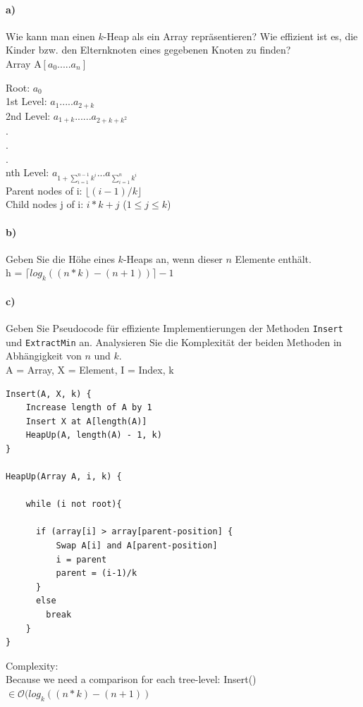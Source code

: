 \documentclass[paper=a4, fontsize=11pt]{scrartcl}
\numberwithin{equation}{section}
\numberwithin{figure}{section}
\numberwithin{table}{section}
\begin{document}
\paragraph{a)}
Wie kann man einen $k$-Heap als ein Array repräsentieren? Wie effizient ist es, die Kinder bzw. den Elternknoten eines gegebenen Knoten zu finden? \\

Array A$[a_0 ..... a_n]$

Root: $a_0$\\
1st Level: $a_1 ..... a_{2+k}$ \\
2nd Level: $a_{1+k} ...... a_{2+k+k^2}$\\
.\\
.\\
.\\
nth Level: $a_{1+ \sum_{i=1}^{n-1} {k^i}} ... a_{\sum_{i=1}^{n} {k^i}}$\\

Parent nodes of i: $\lfloor{(i-1)/k}\rfloor$\\
Child nodes j of i: $i*k +j$ ($1\leq j \leq k$)\\


\paragraph{b)} Geben Sie die Höhe eines $k$-Heaps an, wenn dieser $n$ Elemente enthält. \\

h = $\lceil log_k((n * k) - (n + 1))\rceil - 1$

\paragraph{c)} 
Geben Sie Pseudocode für effiziente Implementierungen der Methoden \texttt{Insert} und \texttt{ExtractMin} an. Analysieren Sie die Komplexität der beiden Methoden in Abhängigkeit von $n$ und $k$. \\

A = Array, X = Element, I = Index, k

\begin{lstlisting}
Insert(A, X, k) {
    Increase length of A by 1
    Insert X at A[length(A)]
    HeapUp(A, length(A) - 1, k)
}

HeapUp(Array A, i, k) {
    
    while (i not root){
    
      if (array[i] > array[parent-position] {
          Swap A[i] and A[parent-position]
          i = parent
          parent = (i-1)/k
      }
      else 
      	break
	}
}

\end{lstlisting}
Complexity:\\
Because we need a comparison for each tree-level: Insert() $\in \mathcal{O}(log_k((n*k) - (n+1))$\\
	
\end{document}

